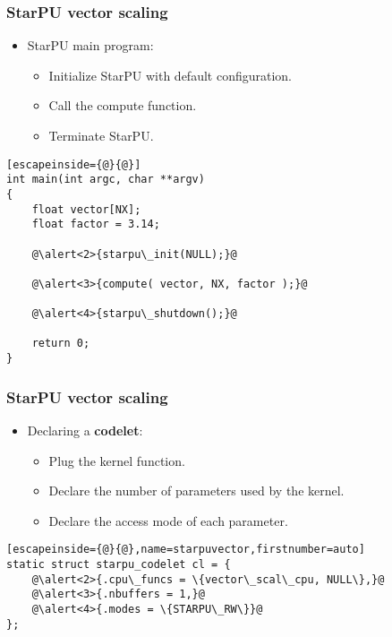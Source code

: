 \begin{frame}
  \frametitle{StarPU vector scaling}
  \begin{itemize}
  \item StarPU main program:
    \begin{itemize}
    \item<2-> Initialize StarPU with default configuration.
    \item<3-> Call the compute function.
    \item<4-> Terminate StarPU.
    \end{itemize}
  \end{itemize}
  \begin{block}{}
\begin{lstlisting}[escapeinside={@}{@}]
int main(int argc, char **argv)
{
    float vector[NX];
    float factor = 3.14;
    
    @\alert<2>{starpu\_init(NULL);}@

    @\alert<3>{compute( vector, NX, factor );}@

    @\alert<4>{starpu\_shutdown();}@
    
    return 0;
}
\end{lstlisting}
  \end{block}
\end{frame}
\begin{frame}[fragile]
  \frametitle{StarPU vector scaling}
  \begin{itemize}
  \item Declaring a {\bf codelet}:
    \begin{itemize}
    \item<2-> Plug the kernel function.
    \item<3-> Declare the number of parameters used by the kernel.
    \item<4-> Declare the access mode of each parameter.
    \end{itemize}
  \end{itemize}
  \begin{block}{}
\begin{lstlisting}[escapeinside={@}{@},name=starpuvector,firstnumber=auto]
static struct starpu_codelet cl = {
    @\alert<2>{.cpu\_funcs = \{vector\_scal\_cpu, NULL\},}@
    @\alert<3>{.nbuffers = 1,}@
    @\alert<4>{.modes = \{STARPU\_RW\}}@
};
\end{lstlisting}
  \end{block}
\end{frame}
